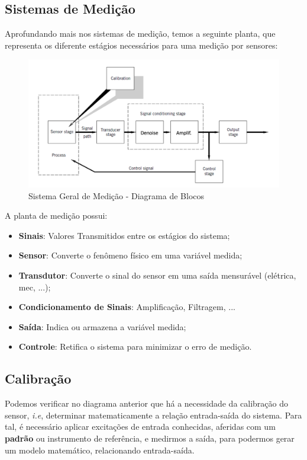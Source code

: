\documentclass{article}
\begin{document}
        \subsection{Sistemas de Medição}
            Aprofundando mais nos sistemas de medição, temos a seguinte planta, que representa os diferente estágios necessários para uma medição por sensores:

            \begin{figure}[h]
                \centering
                \includegraphics[width=.7\textwidth]{imgs/sys_medi.png}
                \caption{Sistema Geral de Medição - Diagrama de Blocos}
            \end{figure}

            A planta de medição possui:
            \begin{itemize}
                \item \textbf{Sinais}: Valores Transmitidos entre os estágios do sistema;
                \item \textbf{Sensor}: Converte o fenômeno físico em uma variável medida;
                \item \textbf{Transdutor}: Converte o sinal do sensor em uma saída mensurável (elétrica, mec, ...);
                \item \textbf{Condicionamento de Sinais}: Amplificação, Filtragem, ...
                \item \textbf{Saída}: Indica ou armazena a variável medida;
                \item \textbf{Controle}: Retifica o sistema para minimizar o erro de medição.
            \end{itemize}

        \subsection{Calibração}
            Podemos verificar no diagrama anterior que há a necessidade da calibração do sensor, \emph{i.e}, determinar matematicamente a relação entrada-saída do sistema.
            Para tal, é necessário aplicar excitações de entrada conhecidas, aferidas com um \textbf{padrão} ou instrumento de referência, e medirmos a saída, para podermos gerar um modelo matemático,
            relacionando entrada-saída.
\end{document}
